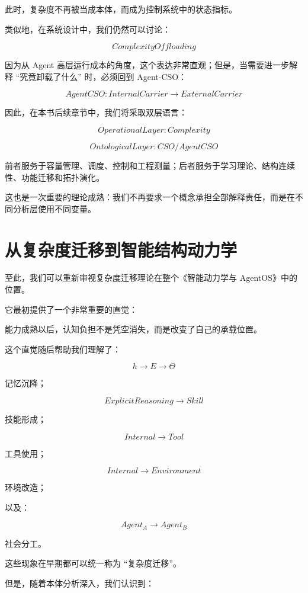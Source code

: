 此时，复杂度不再被当成本体，而成为控制系统中的状态指标。

类似地，在系统设计中，我们仍然可以讨论：

\[
ComplexityOffloading
\]

因为从 Agent 高层运行成本的角度，这个表达非常直观；但是，当需要进一步解释 ``究竟卸载了什么'' 时，必须回到 Agent-CSO：

\[
AgentCSO:
InternalCarrier
\rightarrow
ExternalCarrier
\]

因此，在本书后续章节中，我们将采取双层语言：

\[
\boxed{
OperationalLayer:
Complexity
}
\]

\[
\boxed{
OntologicalLayer:
CSO/AgentCSO
}
\]

前者服务于容量管理、调度、控制和工程测量；后者服务于学习理论、结构连续性、功能迁移和拓扑演化。

这也是一次重要的理论成熟：我们不再要求一个概念承担全部解释责任，而是在不同分析层使用不同变量。

\section{从复杂度迁移到智能结构动力学}
\label{sec:complexity-to-structural-dynamics}

至此，我们可以重新审视复杂度迁移理论在整个《智能动力学与 AgentOS》中的位置。

它最初提供了一个非常重要的直觉：

\begin{statementbox}
能力成熟以后，认知负担不是凭空消失，而是改变了自己的承载位置。
\end{statementbox}

这个直觉随后帮助我们理解了：

\[
h\rightarrow E\rightarrow\Theta
\]

记忆沉降；

\[
ExplicitReasoning
\rightarrow
Skill
\]

技能形成；

\[
Internal
\rightarrow
Tool
\]

工具使用；

\[
Internal
\rightarrow
Environment
\]

环境改造；

以及：

\[
Agent_A
\rightarrow
Agent_B
\]

社会分工。

这些现象在早期都可以统一称为 ``复杂度迁移''。

但是，随着本体分析深入，我们认识到：

